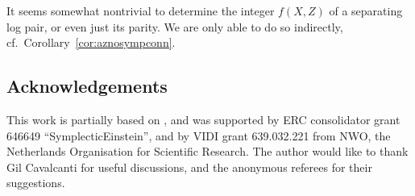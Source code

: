 \documentclass[10pt,a4paper]{amsart}
\numberwithin{equation}{section}
\begin{document}
\begin{Remark} It seems somewhat nontrivial to determine the integer $f(X,Z)$ of a separating log pair, or even just its parity. We are only able to do so indirectly, cf.\ Corollary~\ref{cor:aznosympconn}.
\end{Remark}

\subsection*{Acknowledgements}

This work is partially based on \cite[Chapter 11]{Klaasse17}, and was supported by ERC consolidator grant 646649 ``SymplecticEinstein'', and by VIDI grant 639.032.221 from NWO, the Netherlands Organisation for Scientific Research. The author would like to thank Gil Cavalcanti for useful discussions, and the anonymous referees for their suggestions.

\end{document}
